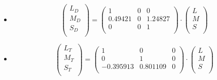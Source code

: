 \documentclass[a4paper,14pt, unknownkeysallowed]{extreport}
\begin{document}
\begin{enumerate}
\begin{itemize}
           
            \item
             \begin{equation} 
                \label{eq:color_blind_sim_deut}
                \begin{pmatrix}
                    L_D \\
                    M_D \\
                    S_D \\
                \end{pmatrix} = 
                \begin{pmatrix}
                    1 & 0 & 0 \\
                    0.49421 & 0 & 1.24827 \\
                    0 & 0 & 1 \\
                \end{pmatrix} \cdot
                \begin{pmatrix}
                    L\\
                    M \\
                    S \\
                \end{pmatrix}
            \end{equation}

            \item
             \begin{equation}
                \label{eq:color_blind_sim_trit}
                \begin{pmatrix}
                    L_T \\
                    M_T \\
                    S_T \\
                \end{pmatrix} = 
                \begin{pmatrix}
                    1 & 0 & 0 \\
                    0 & 1 & 0 \\
                    -0.395913 & 0.801109 & 0 \\
                \end{pmatrix} \cdot
                \begin{pmatrix}
                    L\\
                    M \\
                    S \\
                \end{pmatrix}
            \end{equation}
        \end{itemize}


\end{enumerate}
\end{document}
